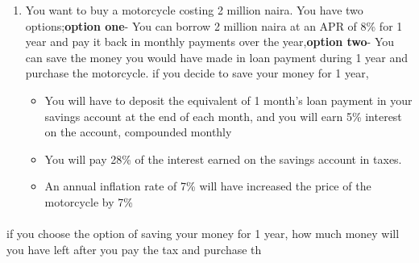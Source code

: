 \documentclass{article}
\begin{document}
\begin{enumerate}
\begin{itemize}
    \end{itemize}
    \item You want to buy a motorcycle costing 2 million naira. You have two options;\textbf{option one}- You can borrow 2 million naira at an APR of 8\% for 1 year and pay it back in monthly payments over the year,\textbf{option two}- You can save the money you would have made in loan payment during 1 year and purchase the motorcycle. 
    if you decide to save your money for 1 year,
    \begin{itemize}
    	\item You will have to deposit the equivalent of 1 month's loan payment in your savings account at the end of each month, and you will earn 5\% interest on the account, compounded monthly
    	\item You will pay 28\% of the interest earned on the savings account in taxes.
    	\item An annual inflation rate of 7\% will have increased the price of the motorcycle by 7\%
    \end{itemize}
   \end{enumerate}
   \paragraph{}
   if you choose the option of saving your money for 1 year, how much money will you have left after you pay the tax and purchase th 	
\end{document}
